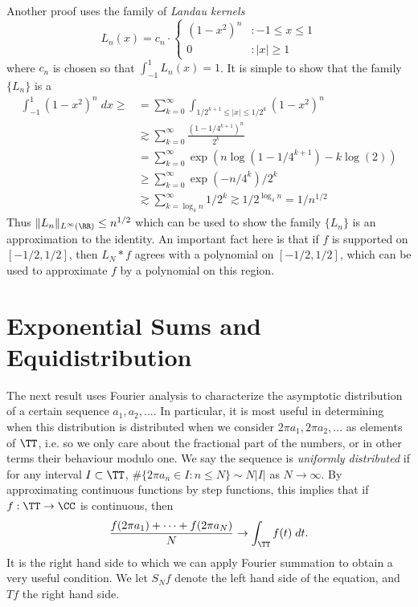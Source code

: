 Another proof uses the family of \emph{Landau kernels}
%
\[ L_n(x) = c_n \cdot \begin{cases} (1 - x^2)^n &: -1 \leq x \leq 1 \\ 0 &: |x| \geq 1 \end{cases} \]
%
where $c_n$ is chosen so that $\int_{-1}^1 L_n(x) = 1$. It is simple to show that the family $\{ L_n \}$ is a
%
\begin{align*}
    \int_{-1}^1 (1 - x^2)^n\; dx \geq &= \sum_{k = 0}^\infty \int_{1/2^{k+1} \leq |x| \leq 1/2^k} (1 - x^2)^n\\
    &\gtrsim \sum_{k = 0}^\infty \frac{(1 - 1/4^{k+1})^n}{2^k}\\
    &= \sum_{k = 0}^\infty \exp \left( n \log(1 - 1/4^{k+1}) - k \log(2) \right)\\
    &\geq \sum_{k = 0}^\infty \exp \left( -n / 4^k \right) / 2^k\\
    &\gtrsim \sum_{k = \log_4 n}^{\infty} 1/2^k \gtrsim 1/2^{\log_4 n} = 1/n^{1/2}
\end{align*}
%
Thus $\| L_n \|_{L^\infty(\RR)} \leq n^{1/2}$ which can be used to show the family $\{ L_n \}$ is an approximation to the identity. An important fact here is that if $f$ is supported on $[-1/2,1/2]$, then $L_N * f$ agrees with a polynomial on $[-1/2,1/2]$, which can be used to approximate $f$ by a polynomial on this region.


\section{Exponential Sums and Equidistribution}

The next result uses Fourier analysis to characterize the asymptotic distribution of a certain sequence $a_1, a_2, \dots$. In particular, it is most useful in determining when this distribution is distributed when we consider $2 \pi a_1, 2 \pi a_2, \dots$ as elements of $\TT$, i.e. so we only care about the fractional part of the numbers, or in other terms their behaviour modulo one. We say the sequence is {\it uniformly distributed} if for any interval $I \subset \TT$, $\# \{ 2 \pi a_n \in I : n \leq N \} \sim N |I|$ as $N \to \infty$. By approximating continuous functions by step functions, this implies that if $f: \TT \to \CC$ is continuous, then
%
\[ \frac{f(2 \pi a_1) + \dots + f(2 \pi a_N)}{N} \to \int_{\TT} f(t)\; dt. \]
%
It is the right hand side to which we can apply Fourier summation to obtain a very useful condition. We let $S_Nf$ denote the left hand side of the equation, and $Tf$ the right hand side.

